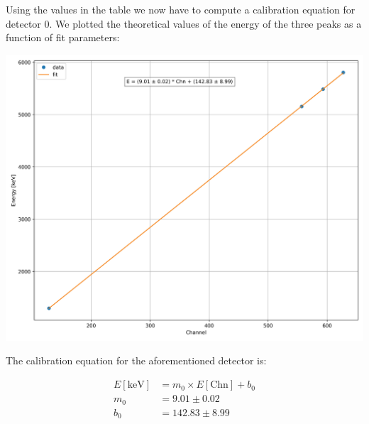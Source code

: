 \documentclass{article}
\begin{document}
\begin{multicols}{2}
Using the values in the table we now have to compute a calibration equation for detector 0.
We plotted the theoretical values of the energy of the three peaks as a function of fit parameters:\vspace{-2mm}

\begin{center}
    \label{TT_21}
    \centering
    \includegraphics[scale = 0.3]{../../images/Chn0_calib_with_Backscattering.jpeg}
\end{center}

The calibration equation for the aforementioned detector is:

\begin{equation}
    \begin{split}
        E[\text{keV}] &= m_0 \times E[\text{Chn}] + b_0 \\
        m_0 &= 9.01 \pm 0.02 \\
        b_0 &= 142.83 \pm 8.99
    \end{split}
    \label{eq:calib0}
\end{equation}


\end{multicols}
\end{document}
